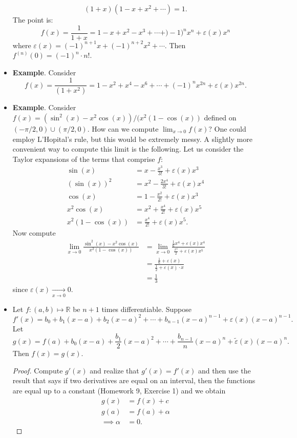 \documentclass{article}
\newcommand{\R}{\mathbb{R}}
\newcommand{\?}{\stackrel{?}{=}}
\theoremstyle{definition} %
\begin{document}
\begin{itemize}
    $$(1 + x)(1 - x + x^2 + \cdots) = 1.$$
    The point is:
    $$f(x) = \frac{1}{1 + x} = 1 - x + x^2 - x^3 + \cdots + )-1)^nx^n + \varepsilon(x)x^n$$
    where $\varepsilon(x) = (-1)^{n + 1}x + (-1)^{n + 2}x^2 + \cdots$. Then $f^{(n)}(0) = (-1)^{n} \cdot n!$.
    \item \textbf{Example}. Consider
    $$f(x) = \frac{1}{(1 + x^2)} = 1 - x^2 + x^4 - x^6 + \cdots + (-1)^nx^{2n} + \varepsilon(x)x^{2n}.$$
    \item \textbf{Example}. Consider $f(x) = (\sin^2(x) - x^2\cos(x))/(x^2(1 - \cos(x))$ defined on $(-\pi/2, 0) \cup (\pi/2, 0)$. How can we compute $\lim_{x \to 0} f(x)$? One could employ L'Hopital's rule, but this would be extremely messy. A slightly more convenient way to compute this limit is the following. Let us consider the Taylor expansions of the terms that comprise $f$:
    \begin{align*}
        \sin(x) &= x - \frac{x^3}{3!} + \varepsilon(x)x^3 \\
        (\sin(x))^2 &= x^2 - \frac{2x^4}{3!} + \varepsilon(x)x^4 \\
        \cos(x) &= 1 - \frac{x^2}{2!} + \varepsilon(x)x^3 \\
        x^2\cos(x) &= x^2 + \frac{x^4}{2!} + \varepsilon(x)x^5 \\
        x^2(1 - \cos(x)) &= \frac{x^4}{2!} + \varepsilon(x)x^5.
    \end{align*}
    Now compute
    \begin{align*}
        \lim_{x \to 0} \frac{\sin^2(x) - x^2\cos(x)}{x^2(1 - \cos(x))} &= \lim_{x \to 0} \frac{\frac{1}{6}x^4 + \varepsilon(x)x^4}{\frac{x^4}{2} + \varepsilon(x)x^5} \\
        &= \frac{\frac{1}{6} + \varepsilon(x)}{\frac{1}{2} + \varepsilon(x) \cdot x} \\
        &= \frac{1}{3}
    \end{align*}
    since $\varepsilon(x) \underset{x \rightarrow 0}{\longrightarrow} 0$.
    \item[]
    \begin{lemma}
        Let $f: (a, b) \mapsto \R$ be $n + 1$ times differentiable. Suppose
        $$f'(x) = b_0 + b_1(x - a) + b_2(x - a)^2 + \cdots + b_{n - 1}(x - a)^{n - 1} + \varepsilon(x)(x - a)^{n - 1}.$$
        Let
        $$g(x) = f(a) + b_0(x - a) + \frac{b_1}{2}(x - a)^2 + \cdots + \frac{b_{n - 1}}{n}(x - a)^n + \widetilde{\varepsilon}(x)(x - a)^n.$$
        Then $f(x) = g(x)$.
    \end{lemma}
    \begin{proof}
        Compute $g'(x)$ and realize that $g'(x) = f'(x)$ and then use the result that says if two derivatives are equal on an interval, then the functions are equal up to a constant (Homework 9, Exercise 1) and we obtain
        \begin{align*}
            g(x) &= f(x) + c \\
            g(a) &= f(a) + \alpha \\
            \implies \alpha &= 0.
        \end{align*}
    \end{proof}
\end{itemize}
\end{document}

